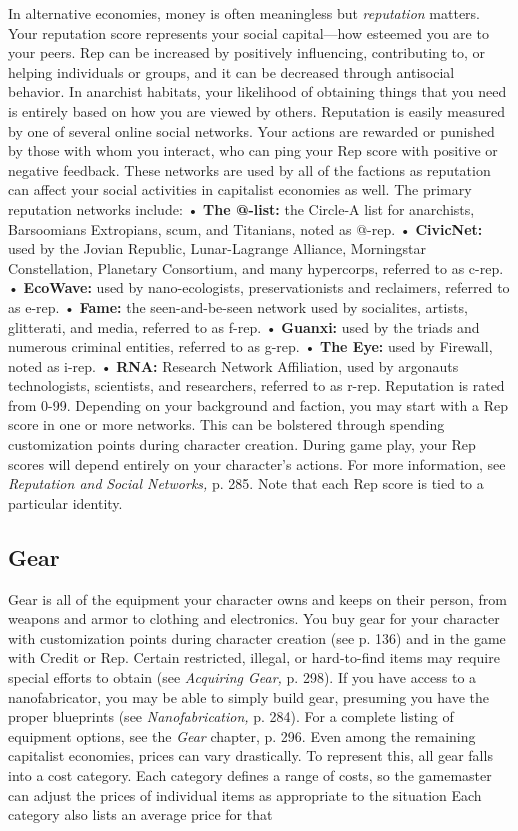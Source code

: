 In alternative economies, money is often meaningless
but \textit{reputation} matters. Your reputation score
represents your social capital—how esteemed you 
are to your peers. Rep can be increased by positively 
influencing, contributing to, or helping individuals or 
groups, and it can be decreased through antisocial 
behavior. In anarchist habitats, your likelihood of 
obtaining things that you need is entirely based on 
how you are viewed by others.
Reputation is easily measured by one of several 
online social networks. Your actions are rewarded 
or punished by those with whom you interact, who 
can ping your Rep score with positive or negative 
feedback. These networks are used by all of the factions
as reputation can affect your social activities in
capitalist economies as well. The primary reputation 
networks include:
• \textbf{The @-list:} the Circle-A list for anarchists, Barsoomians
Extropians, scum, and Titanians, noted
as @-rep.
• \textbf{CivicNet:} used by the Jovian Republic, Lunar-Lagrange
Alliance, Morningstar Constellation,
Planetary Consortium, and many hypercorps, 
referred to as c-rep.
• \textbf{EcoWave:} used by nano-ecologists, preservationists
and reclaimers, referred to as e-rep.
•  \textbf{Fame:} the seen-and-be-seen network used by 
socialites, artists, glitterati, and media, referred 
to as f-rep.
• \textbf{Guanxi:} used by the triads and numerous criminal
entities, referred to as g-rep.
•  \textbf{The Eye:} used by Firewall, noted as i-rep.
• \textbf{RNA:} Research Network Affiliation, used by argonauts
technologists, scientists, and researchers,
referred to as r-rep.
Reputation is rated from 0-99. Depending on 
your background and faction, you may start with 
a Rep score in one or more networks. This can be 
bolstered through spending customization points 
during character creation. During game play, your 
Rep scores will depend entirely on your character's 
actions. For more information, see \textit{Reputation and }
\textit{Social Networks,} p. 285.
Note that each Rep score is tied to a particular 
identity.

\subsection{Gear}

Gear is all of the equipment your character owns and 
keeps on their person, from weapons and armor to 
clothing and electronics. You buy gear for your character
with customization points during character creation
(see p. 136) and in the game with Credit or Rep.
Certain restricted, illegal, or hard-to-find items may 
require special efforts to obtain (see \textit{Acquiring Gear,} 
p. 298). If you have access to a nanofabricator, you 
may be able to simply build gear, presuming you have 
the proper blueprints (see \textit{Nanofabrication,} p. 284). 
For a complete listing of equipment options, see the 
\textit{Gear} chapter, p. 296.
Even among the remaining capitalist economies, 
prices can vary drastically. To represent this, all 
gear falls into a cost category. Each category defines 
a range of costs, so the gamemaster can adjust the 
prices of individual items as appropriate to the situation
Each category also lists an average price for that


